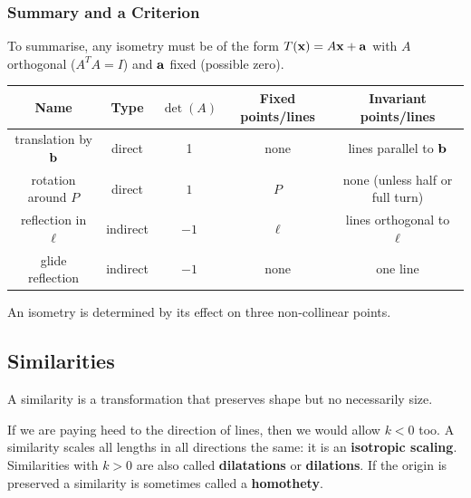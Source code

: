 \subsubsection{Summary and a Criterion}

To summarise, any isometry must be of the form \(T(\mathbf{x}) = A\mathbf{x} + \mathbf{a}\) with \(A\) orthogonal (\(A^TA = I\)) and \(\mathbf{a}\) fixed (possible zero).

\begin{center}
    \begin{tabular}{|c|c|c|c|c|}
        \hline
        Name                   & Type     & \(\det(A)\) & Fixed points/lines & Invariant points/lines          \\
        \hline
        \hline
        translation by \(\mathbf{b}\) & direct   & 1           & none               & lines parallel to \(\mathbf{b}\)       \\
        \hline
        rotation around \(P\)  & direct   & \(1\)       & \(P\)              & none (unless half or full turn) \\
        \hline
        reflection in \(\ell\) & indirect & \(-1\)      & \(\ell\)           & lines orthogonal to \(\ell\)    \\
        \hline
        glide reflection       & indirect & \(-1\)      & none               & one line                        \\
        \hline
    \end{tabular}
\end{center}

\begin{theorem}
    An isometry is determined by its effect on three non-collinear points.
\end{theorem}

\subsection{Similarities}

A similarity is a transformation that preserves shape but no necessarily size.


If we are paying heed to the direction of lines, then we would allow \(k < 0\) too. A similarity scales all lengths in all directions the same: it is an \textbf{isotropic scaling}. Similarities with \(k > 0\) are also called \textbf{dilatations} or \textbf{dilations}. If the origin is preserved a similarity is sometimes called a \textbf{homothety}.

